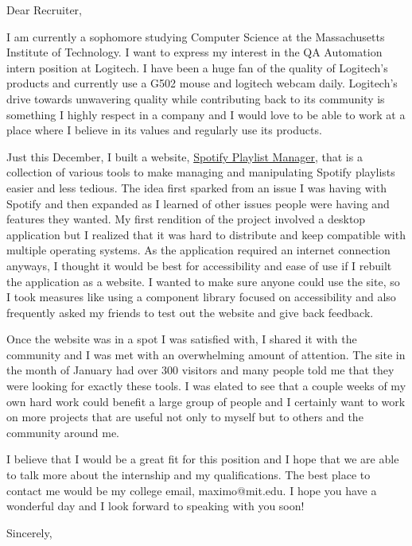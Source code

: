 \documentclass[12pt]{letter}
\begin{document}
\begin{letter}{}
    \opening{Dear Recruiter,}
    I am currently a sophomore studying Computer Science at the Massachusetts Institute of Technology.
    I want to express my interest in the QA Automation intern position at Logitech.
    I have been a huge fan of the quality of Logitech's products and currently use a G502 mouse and logitech webcam daily.
    Logitech's drive towards unwavering quality while contributing back to its community is something I highly respect in a company and I would love to be able to work at a place where I believe in its values and regularly use its products.

    Just this December, I built a website, \href{https://www.spotifyplaylistmanager.net}{Spotify Playlist Manager}, that is a collection of various tools to make
    managing and manipulating Spotify playlists easier and less tedious. The idea first sparked from an issue I was having with Spotify and then expanded as I learned
    of other issues people were having and features they wanted. My first rendition of the project involved a desktop application but I realized that it was
    hard to distribute and keep compatible with multiple operating systems. As the application required an internet connection anyways, I thought it would be
    best for accessibility and ease of use if I rebuilt the application as a website. I wanted to make sure anyone could use the site, so I took measures
    like using a component library focused on accessibility and also frequently asked my friends to test out the website and give back feedback.

    Once the website was in a spot I was satisfied with, I shared it with the community and I was met with an overwhelming amount of attention.
    The site in the month of January had over 300 visitors and many people told me that they were looking for exactly these tools.
    I was elated to see that a couple weeks of my own hard work could benefit a large group of people and I certainly want to work on more projects
    that are useful not only to myself but to others and the community around me.

    I believe that I would be a great fit for this position and I hope that we are able to talk more about the internship and my qualifications.
    The best place to contact me would be my college email, maximo@mit.edu. I hope you have a wonderful day and I look forward to speaking with you soon!
    \closing{Sincerely,}
\end{letter}
\end{document}
